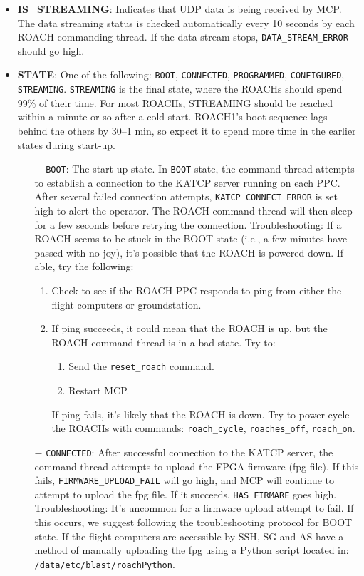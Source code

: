 \begin{itemize}[leftmargin=*,label={}]

\item \textbf{IS\_STREAMING}: Indicates that UDP data is being received by MCP. The data streaming status is checked automatically every 10 seconds by each ROACH commanding thread. If the data stream stops, \texttt{DATA\_STREAM\_ERROR} should go high.

\item \textbf{STATE}: One of the following: \texttt{BOOT}, \texttt{CONNECTED}, \texttt{PROGRAMMED}, \texttt{CONFIGURED}, \texttt{STREAMING}. \texttt{STREAMING} is the final state, where the ROACHs should spend 99\% of their time. For most ROACHs, STREAMING should be reached within a minute or so after a cold start. ROACH1’s boot sequence lags behind the others by 30--1 min, so expect it to spend more time in the earlier states during start-up.

\begin{itemize}
    \item[$-$] \texttt{BOOT}: The start-up state. In \texttt{BOOT} state, the command thread attempts to establish a connection to the KATCP server running on each PPC. After several failed connection attempts, \texttt{KATCP\_CONNECT\_ERROR} is set high to alert the operator. The ROACH command thread will then sleep for a few seconds before retrying the connection.
    Troubleshooting:
    If a ROACH seems to be stuck in the BOOT state (i.e., a few minutes have passed with no joy), it’s possible that the ROACH is powered down. If able, try the following:
    \begin{enumerate}
      \item Check to see if the ROACH PPC responds to ping from either the flight computers or groundstation.
      \item If ping succeeds, it could mean that the ROACH is up, but the ROACH command thread is in a bad state. Try to:
        \begin{enumerate}
          \item Send the \texttt{reset\_roach} command.
          \item Restart MCP.
        \end{enumerate}
       If ping fails, it’s likely that the ROACH is down. Try to power cycle the ROACHs with commands: \texttt{roach\_cycle}, \texttt{roaches\_off}, \texttt{roach\_on}.
    \end{enumerate}

\item[$-$] \texttt{CONNECTED}: After successful connection to the KATCP server, the command thread attempts to upload the FPGA firmware (fpg file). If this fails, \texttt{FIRMWARE\_UPLOAD\_FAIL} will go high, and MCP will continue to attempt to upload the fpg file. If it succeeds, \texttt{HAS\_FIRMARE} goes high.
Troubleshooting:
It’s uncommon for a firmware upload attempt to fail. If this occurs, we suggest following the troubleshooting protocol for BOOT state. If the flight computers are accessible by SSH, SG and AS have a method of manually uploading the fpg using a Python script located in: \texttt{/data/etc/blast/roachPython}.


\end{itemize}
\end{itemize}
